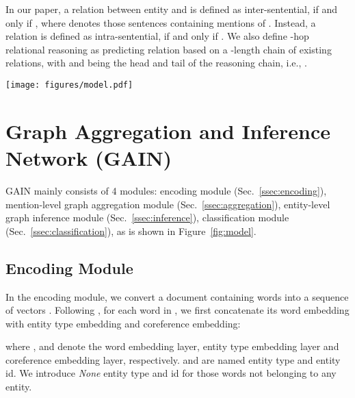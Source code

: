 \documentclass[11pt,a4paper]{article}
\begin{document}
In our paper, a relation  between entity  and  is defined as inter-sentential, if and only if , where  denotes those sentences containing mentions of . 
Instead, a relation  is defined as intra-sentential, if and only if .
We also define -hop relational reasoning as predicting relation  based on a -length chain of existing relations, with  and  being the head and tail of the reasoning chain, i.e., .







 \begin{figure*}
    \centering
    \texttt{[image: figures/model.pdf]}
    \caption{The overall architecture of GAIN. First, A context encoder consumes the input document to get a contextualized representation of each word. Then, the Mention-level Graph is constructed with mention nodes and a document node. After applying GCN, the graph is transformed into Entity-level Graph, where the paths between entities are identified for reasoning. Finally, the classification module predicts target relations based on the above information. Different entities are in different colors. The number  in the mention node denotes that it belongs to the -th sentence.}
    \label{fig:model}
\end{figure*}
\section{Graph Aggregation and Inference Network (GAIN)\label{sec:model}}

GAIN mainly consists of 4 modules: 
encoding module (Sec.~\ref{ssec:encoding}), 
mention-level graph aggregation module (Sec.~\ref{ssec:aggregation}),
entity-level graph inference module (Sec.~\ref{ssec:inference}), classification module (Sec.~\ref{ssec:classification}), as is shown in Figure~\ref{fig:model}.

\subsection{Encoding Module\label{ssec:encoding}}
In the encoding module, we convert a document  containing  words into a sequence of vectors .
Following \citet{yao-etal-19-docred}, for each word  in , we first concatenate its word embedding with entity type embedding and coreference embedding:

where  ,  and  denote the word embedding layer, entity type embedding layer and coreference embedding layer, respectively.  and  are named entity type and entity id. 
We introduce \textit{None} entity type and id for those words not belonging to any entity.
\end{document}
